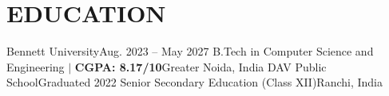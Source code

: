 \section{EDUCATION}
  \resumeSubHeadingListStart
    \resumeSubheading
      {Bennett University}{Aug. 2023 -- May 2027}
      {B.Tech in Computer Science and Engineering $|$ \textbf{CGPA: 8.17/10}}{Greater Noida, India}
      \resumeItemListStart
      \resumeItemListEnd
    \resumeSubheading
      {DAV Public School}{Graduated 2022}
      {Senior Secondary Education (Class XII)}{Ranchi, India}
  \resumeSubHeadingListEnd
